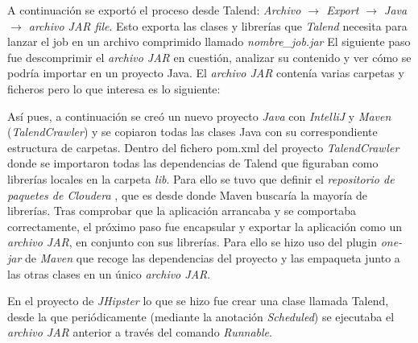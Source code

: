 A continuación se exportó el proceso desde Talend: 
\textit{Archivo $\rightarrow$ Export $\rightarrow$ Java $\rightarrow$ archivo JAR file}. Esto exporta las clases y librerías que \textit{Talend} necesita para lanzar el job en un archivo comprimido llamado \textit{nombre\_job.jar}
El siguiente paso fue descomprimir el \textit{archivo JAR} en cuestión, analizar su contenido y ver cómo se podría importar en un proyecto Java. El \textit{archivo JAR} contenía varias carpetas y ficheros pero lo que interesa es lo siguiente:
\bigskip
\par 
{}
\bigskip
\par
Así pues, a continuación se creó un nuevo proyecto \textit{Java} con \textit{IntelliJ} y \textit{Maven} (\textit{TalendCrawler}) y se copiaron todas las clases Java con su correspondiente estructura de carpetas. Dentro del fichero pom.xml del proyecto \textit{TalendCrawler} donde se importaron todas las dependencias de Talend que figuraban como librerías locales en la carpeta \textit{lib}. Para ello se tuvo que definir el \textit{repositorio de paquetes de Cloudera} \cite{cloudera}, que es desde donde Maven buscaría la mayoría de librerías. Tras comprobar que la aplicación arrancaba y se comportaba correctamente, el próximo paso fue encapsular y exportar la aplicación como un \textit{archivo JAR}, en conjunto con sus librerías. Para ello se hizo uso del plugin \textit{one-jar} de \textit{Maven} que recoge las dependencias del proyecto y las empaqueta junto a las otras clases en un único \textit{archivo JAR}.\par 

En el proyecto de \textit{JHipster} lo que se hizo fue crear una clase llamada Talend, desde la que periódicamente (mediante la anotación \textit{Scheduled}) se ejecutaba el \textit{archivo JAR} anterior a través del comando \textit{Runnable}. 

